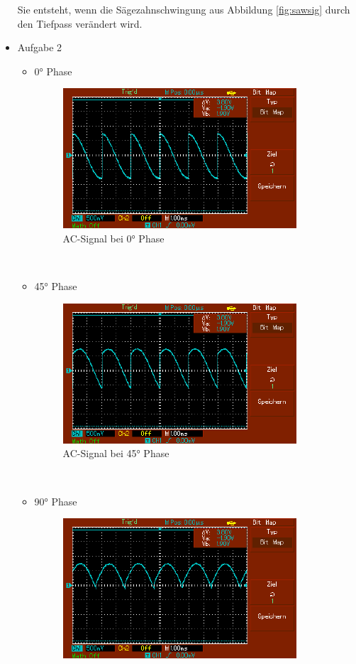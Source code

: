 \documentclass[captions=tableheading]{scrartcl}
\begin{document}
\begin{itemize}
            Sie entsteht, wenn die Sägezahnschwingung aus Abbildung \ref{fig:sawsig} durch den Tiefpass verändert wird.
        \newpage
        \item{Aufgabe 2 \\}
            \begin{itemize}
            \item{0° Phase}
            \begin{figure}
                \centering
                \includegraphics{Lock_In Bilder/Aufgabe 2/MAP001.pdf}
                \caption{AC-Signal bei 0° Phase}
                \label{fig:0sig}
            \end{figure}
            \\
            \item{45° Phase}
            \begin{figure}
                \centering
                \includegraphics{Lock_In Bilder/Aufgabe 2/MAP002.pdf}
                \caption{AC-Signal bei 45° Phase}
                \label{fig:45sig}
            \end{figure}
            \\
            \item{90° Phase}
            \begin{figure}
                \centering
                \includegraphics{Lock_In Bilder/Aufgabe 2/MAP003.pdf}

\end{figure}
\end{itemize}
\end{itemize}
\end{document}
